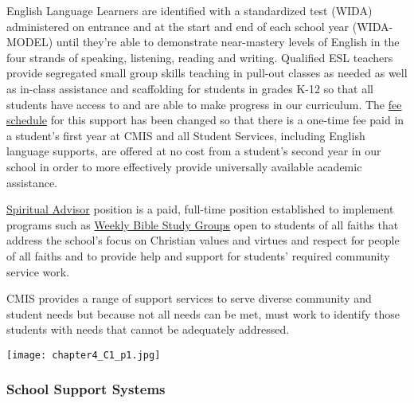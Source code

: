 \begin{findings}
English Language Learners are identified with a standardized test (WIDA) administered on entrance and at the start and end of each school year (WIDA-MODEL) until they’re able to demonstrate near-mastery levels of English in the four strands of speaking, listening, reading and writing.  Qualified ESL teachers provide segregated small group skills teaching in pull-out classes as needed as well as in-class assistance and scaffolding for students in grades K-12 so that all students have access to and are able to make progress in our curriculum. The \href{https://docs.google.com/document/d/1j2Z1tLgRgfX9CH3dzoYtU_GOhPOVWKPl6iFlvWqd6wM/edit}{fee schedule} for this support has been changed so that there is a one-time fee paid in a student’s first year at CMIS and all Student Services, including English language supports, are offered at no cost from a student’s second year in our school in order to more effectively provide universally available academic assistance. 

\href{http://blogs.cmis.ac.th/eagles/faith-service/spiritual-life/}{Spiritual Advisor} position is a paid, full-time position established to implement programs such as \href{http://blogs.cmis.ac.th/eagles/faith-service/spiritual-life/}{Weekly Bible Study Groups} open to students of all faiths that address the school’s focus on Christian values and virtues and respect for people of all faiths and to provide help and support for students’ required community service work.


CMIS provides a range of support services to serve diverse community and student needs but because not all needs can be met, must work to identify those students with needs that cannot be adequately addressed.
\end{findings}

{\centering\texttt{[image: chapter4\_C1\_p1.jpg]}}

\subsubsection{School Support Systems}



